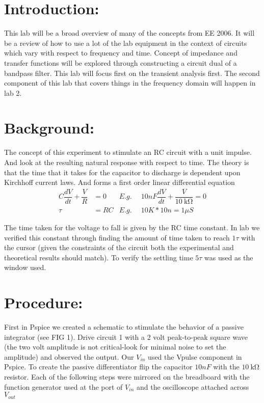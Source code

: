 \documentclass[10pt,a4paper]{article}
\begin{document}
\section*{Introduction:}
This lab will be a broad overview of many of the concepts from EE 2006. It will be a review of how to use a lot of the lab equipment in the context of circuits which vary with respect to frequency and time. Concept of impedance and transfer functions will be explored through constructing a circuit dual of a bandpass filter. This lab will focus first on the transient analysis first. The second component of this lab that covers things in the frequency domain will happen in lab 2. 
\section*{Background:}

The concept of this experiment to stimulate an RC circuit with a unit impulse. And look at the resulting natural response with respect to time. The theory is that the time that it takes for the capacitor to discharge is dependent upon Kirchhoff current laws.  And forms a first order linear differential equation 
\begin{align}
C \dfrac{dV}{dt}+\dfrac{V}{R}&=0 & E.g. \enspace  & 10nF \dfrac{dV}{dt}+ \dfrac{V}{\SI{10}{\kohm}}=0\\
\tau&=RC  &  E.g. \enspace  & 10K*10n = 1\mu S
\end{align}

The time taken for the voltage to fall  is given by the RC time constant. In lab we verified this constant through finding the amount of time taken to reach $1\tau$ with the cursor  (given the constraints of the circuit both the experimental and theoretical results should match). To verify the settling time $5\tau$ was used as the window used.
\section*{Procedure:}
First in Pspice we created a schematic to stimulate the behavior of a passive integrator (see FIG 1).  Drive circuit 1 with a 2 volt peak-to-peak square wave  (the two volt amplitude is not critical-look for minimal noise to set the amplitude) and observed the output. Our $V_{in}$ used the Vpulse component in Pspice.  To create the passive differentiator flip the capacitor $10nF$ with the $\SI{10}{\kohm}$ resistor. Each of the following steps were mirrored on the breadboard with the function generator used at the port of $V_{in}$ and the oscilloscope attached across $V_{out}$ 
\end{document}
